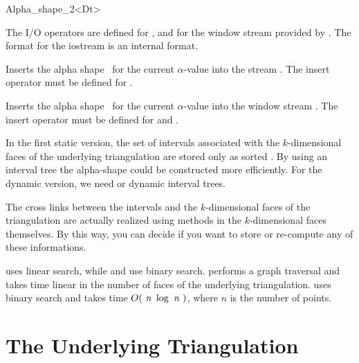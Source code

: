 \begin{ccClassTemplate} {Alpha_shape_2<Dt>}

The I/O operators are defined for , and for
the window stream provided by \cgal. The format for the iostream
is an internal format. 


{Inserts the alpha shape \ccVar\ for the current $\alpha$-value into the stream .
\ccPrecond The insert operator must be defined for .}



{Inserts the alpha shape \ccVar\ for the current $\alpha$-value into the window stream .
\ccPrecond The insert operator must be defined for  and .}
\end{ccClassTemplate}

\ccImplementation
In the first static version, the set of intervals associated with the
$k$-dimensional faces of the underlying triangulation are
stored only as sorted . By using an interval tree the
alpha-shape could be constructed more efficiently. For the dynamic
version, we need  or dynamic interval trees.

The cross links between the intervals and the $k$-dimensional faces of the
triangulation are actually realized using methods in the $k$-dimensional faces
themselves. By this way, you can decide if you want to store or re-compute any
of these informations.


 uses linear search, while 
 and  
use binary search.
 performs a graph traversal and takes time
linear in the number of faces of the underlying triangulation.
 uses binary search and takes time
$O(\mbox{ \em n } \log{\mbox{ \em n } })$, where  $n$ is the number of points.


\section{The Underlying Triangulation\label{I1_SectDtClass}}

